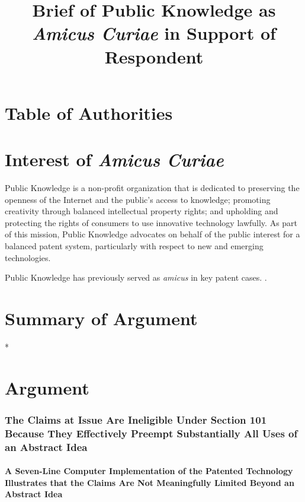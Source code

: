 \documentclass{scotus}
\title{Brief of Public Knowledge as
\protect\\\emph{Amicus Curiae} in Support of Respondent}
\def\Numlines{Seven\xspace}
\begin{document}
\maketitle

\romanpagenumbers
\tableofcontents

\part{Table of Authorities}

\tableofauthorities

\clearpage
\arabicpagenumbers

\part{Interest of \emph{Amicus Curiae}}

Public Knowledge is a non-profit organization that is dedicated to preserving
the openness of the Internet and the public's access to knowledge; promoting
creativity through balanced intellectual property rights; and upholding and
protecting the rights of consumers to use innovative technology lawfully. As
part of this mission, Public Knowledge advocates on behalf of the public
interest for a balanced patent system, particularly with respect to new and
emerging technologies.

Public Knowledge has previously served as \emph{amicus} in key patent cases.
.


\part{Summary of Argument}

*

\part{Argument}

\section{The Claims at Issue Are Ineligible Under Section 101 Because They
Effectively Preempt Substantially All Uses of an Abstract Idea}

\subsection{A \Numlines-Line Computer Implementation of the Patented Technology
Illustrates that the Claims Are Not Meaningfully Limited Beyond an Abstract
Idea}
\end{document}

